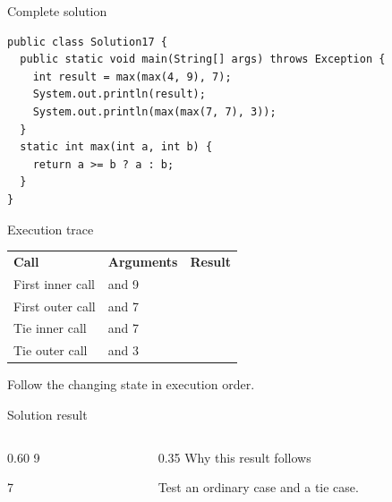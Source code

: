 \documentclass[10pt,aspectratio=169]{beamer}
\begin{document}
\begin{frame}[fragile,t]{Complete solution}
\begin{lstlisting}
public class Solution17 {
  public static void main(String[] args) throws Exception {
    int result = max(max(4, 9), 7);
    System.out.println(result);
    System.out.println(max(max(7, 7), 3));
  }
  static int max(int a, int b) {
    return a >= b ? a : b;
  }
}
\end{lstlisting}
\end{frame}

\begin{frame}[fragile,t]{Execution trace}
\small\renewcommand{\arraystretch}{1.5}
\begin{tabularx}{\textwidth}{>{\raggedright\arraybackslash}X>{\raggedright\arraybackslash}X>{\raggedright\arraybackslash}X}
\rowcolor{navy}
\color{white}\bfseries Call & \color{white}\bfseries Arguments & \color{white}\bfseries Result\\
First inner call & 4 and 9 & 9\\
First outer call & 9 and 7 & 9\\
Tie inner call & 7 and 7 & 7\\
Tie outer call & 7 and 3 & 7\\
\end{tabularx}
\vspace{3mm}\footnotesize Follow the changing state in execution order.
\end{frame}

\begin{frame}[fragile,t]{Solution result}
\begin{columns}[T,onlytextwidth]\begin{column}{0.60\textwidth}
9\par 7
\end{column}\begin{column}{0.35\textwidth}\small
Why this result follows

Test an ordinary case and a tie case.
\end{column}\end{columns}
\end{frame}
\end{document}
